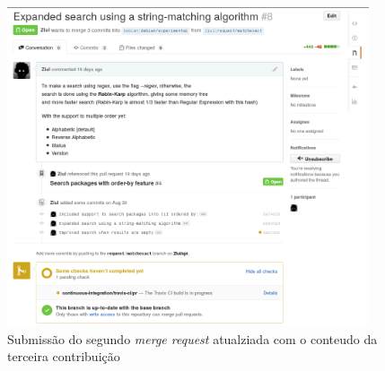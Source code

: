 \begin{figure}[h]
  \centering
	\includegraphics[width=0.95\textwidth]{figuras/pr3}
  \caption{Submissão do segundo \textit{merge request} atualziada com o conteudo da terceira contribuição}
  \label{fig:pr3_travisok}
\end{figure}
